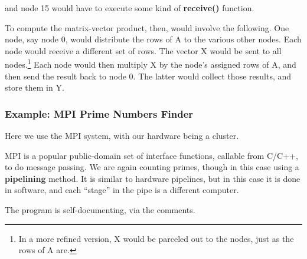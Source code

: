 and node 15 would have to execute some kind of {\bf receive()} function.

To compute the matrix-vector product, then, would involve the following.
One node, say node 0, would distribute the rows of A to the various
other nodes.  Each node would receive a different set of rows.  The
vector X would be sent to all nodes.\footnote{In a more refined version,
X would be parceled out to the nodes, just as the rows of A are.} Each
node would then multiply X by the node's assigned rows of A, and then
send the result back to node 0.  The latter would collect those results,
and store them in Y.

\subsubsection{Example:  MPI Prime Numbers Finder}
\label{mpiex}

Here we use the MPI system, with our hardware being a cluster.

MPI is a popular public-domain set of interface functions, callable from
C/C++, to do message passing.  We are again counting primes, though in
this case using a \textbf{pipelining} method.  It is similar to hardware
pipelines, but in this case it is done in software, and each ``stage''
in the pipe is a different computer.

The program is self-documenting, via the comments.

